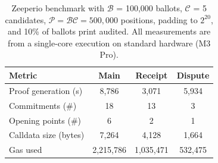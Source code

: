 \begin{table}[t!]
\centering
\caption{Zeeperio benchmark with $\mathcal{B}$ = 100,000 ballots, $\mathcal{C}$ = 5 candidates, $\mathcal{P} = \mathcal{B}\mathcal{C} = 500,000$ positions, padding to $2^{20}$, and 10\% of ballots print audited. All measurements are from a single-core execution on standard hardware (M3 Pro).}
\begin{tabular}{lccc}
\hline
\textbf{Metric} & \textbf{Main} & \textbf{Receipt} & \textbf{Dispute} \\
\hline
Proof generation (s) & 8,786 & 3,071 & 5,934 \\
Commitments (\#) & 18 & 13 & 3 \\
Opening points (\#) & 6 & 2 & 1 \\
Calldata size (bytes) & 7,264 & 4,128 & 1,664 \\
Gas used & 2,215,786 & 1,035,471 & 532,475 \\
\hline
\end{tabular}
\label{tab:eval-table2}
\end{table}
